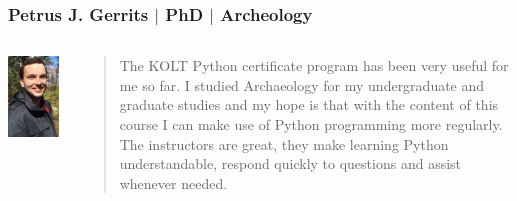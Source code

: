       \begin{frame}
        \frametitle{Petrus J. Gerrits $\mid$ PhD $\mid$ Archeology}
        \begin{columns}
          \begin{column}{0.3\textwidth}
            \centering
            \includegraphics[width=\textwidth]{images/pgerrits.png}
          \end{column}
          \LARGE
          \begin{column}{0.7\textwidth}
            \begin{quote}
              The KOLT Python certificate program has been very useful for me so far. I studied Archaeology for my undergraduate and graduate studies and my hope is that with the content of this course I can make use of Python programming more regularly. The instructors are great, they make learning Python understandable, respond quickly to questions and assist whenever needed.
            \end{quote}
          \end{column}
        \end{columns}
      \end{frame}

